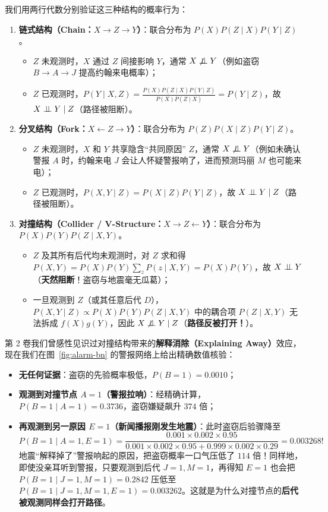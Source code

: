 我们用两行代数分别验证这三种结构的概率行为：
\begin{enumerate}
  \item \textbf{链式结构（Chain：$X \to Z \to Y$）}：联合分布为 $P(X)P(Z\mid X)P(Y\mid Z)$。
  \begin{itemize}
    \item $Z$ 未观测时，$X$ 通过 $Z$ 间接影响 $Y$，通常 $X \not\perp\!\!\!\perp Y$（例如盗窃 $B \to A \to J$ 提高约翰来电概率）；
    \item $Z$ 已观测时，$P(Y \mid X, Z) = \frac{P(X)P(Z\mid X)P(Y\mid Z)}{P(X)P(Z\mid X)} = P(Y\mid Z)$，故 $X \perp\!\!\!\perp Y \mid Z$（路径被阻断）。
  \end{itemize}
  \item \textbf{分叉结构（Fork：$X \leftarrow Z \to Y$）}：联合分布为 $P(Z)P(X\mid Z)P(Y\mid Z)$。
  \begin{itemize}
    \item $Z$ 未观测时，$X$ 和 $Y$ 共享隐含“共同原因” $Z$，通常 $X \not\perp\!\!\!\perp Y$（例如未确认警报 $A$ 时，约翰来电 $J$ 会让人怀疑警报响了，进而预测玛丽 $M$ 也可能来电）；
    \item $Z$ 已观测时，$P(X, Y \mid Z) = P(X\mid Z)P(Y\mid Z)$，故 $X \perp\!\!\!\perp Y \mid Z$（路径被阻断）。
  \end{itemize}
  \item \textbf{对撞结构（Collider / V-Structure：$X \to Z \leftarrow Y$）}：联合分布为 $P(X)P(Y)P(Z\mid X, Y)$。
  \begin{itemize}
    \item $Z$ 及其所有后代均未观测时，对 $Z$ 求和得 $P(X, Y) = P(X)P(Y)\sum_z P(z\mid X, Y) = P(X)P(Y)$，故 $X \perp\!\!\!\perp Y$（\textbf{天然阻断}！盗窃与地震毫无瓜葛）；
    \item 一旦观测到 $Z$（或其任意后代 $D$），$P(X, Y \mid Z) \propto P(X)P(Y)P(Z\mid X, Y)$ 中的耦合项 $P(Z\mid X, Y)$ 无法拆成 $f(X)g(Y)$，因此 $X \not\perp\!\!\!\perp Y \mid Z$（\textbf{路径反被打开！}）。
  \end{itemize}
\end{enumerate}

第 2 卷我们曾感性见识过对撞结构带来的\textbf{解释消除（Explaining Away）}效应，现在我们在图~\ref{fig:alarm-bn} 的警报网络上给出精确数值核验：
\begin{itemize}
  \item \textbf{无任何证据}：盗窃的先验概率极低，$P(B=1) = 0.0010$；
  \item \textbf{观测到对撞节点 $A=1$（警报拉响）}：经精确计算，$P(B=1 \mid A=1) = 0.3736$，盗窃嫌疑飙升 $374$ 倍；
  \item \textbf{再观测到另一原因 $E=1$（新闻播报刚发生地震）}：此时盗窃后验骤降至
  \[
    P(B=1 \mid A=1, E=1) = \frac{0.001 \times 0.002 \times 0.95}{0.001 \times 0.002 \times 0.95 + 0.999 \times 0.002 \times 0.29} = 0.003268!
  \]
  地震“解释掉了”警报响起的原因，把盗窃概率一口气压低了 $114$ 倍！同样地，即使没亲耳听到警报，只要观测到后代 $J=1, M=1$，再得知 $E=1$ 也会把 $P(B=1 \mid J=1, M=1) = 0.2842$ 压低至 $P(B=1 \mid J=1, M=1, E=1) = 0.003262$。这就是为什么对撞节点的\textbf{后代被观测同样会打开路径}。
\end{itemize}

